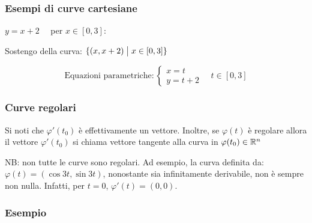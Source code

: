\subsubsection*{Esempi di curve cartesiane}

\(y=x+2 \quad \) per \(x \in [0,3]\):

Sostengo della curva: \( \{(x,x+2) \;\big|\; x \in [0,3]\} \)

\begin{equation*}
    \text{Equazioni parametriche}:
    \begin{cases}
        x = t \\
        y = t + 2
    \end{cases}
    \quad t \in [0,3]
\end{equation*}

\filbreak{}
\subsubsection{Curve regolari}


Si noti che \(\varphi'(t_0)\) è effettivamente un vettore. Inoltre, se \(\varphi(t)\) è regolare allora il vettore \(\varphi'(t_0)\) si chiama vettore tangente alla curva in \(\varphi(t_0) \in \mathbb{R}^{n} \)

NB{:} non tutte le curve sono regolari. Ad esempio, la curva definita da: \(\varphi(t) = (\cos 3t, \sin 3t)\), nonostante sia infinitamente derivabile, non è sempre non nulla. Infatti, per \(t=0\), \(\varphi'(t)=(0,0)\).

\subsubsection*{Esempio}

